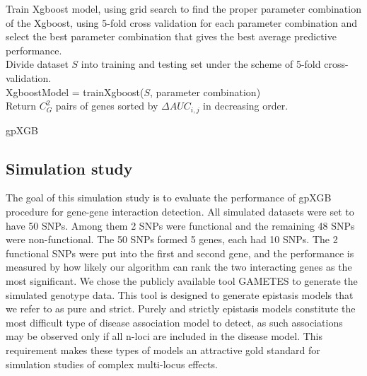 \documentclass[11pt]{article}
\theoremstyle{plain}
\theoremstyle{definition}
\theoremstyle{remark}
\begin{document}
\begin{algorithm}[H]
\SetAlgoLined
{}
Train Xgboost model, using grid search to find the proper parameter combination of the Xgboost, using 5-fold cross validation for each parameter combination and select the best parameter combination that gives the best average predictive performance.\\
Divide dataset $S$ into training and testing set under the scheme of 5-fold cross-validation.\\
XgboostModel = trainXgboost($S$, parameter combination)\\
Return $C^2_G$ pairs of genes sorted by $\Delta AUC_{i,j}$ in decreasing order.
 \caption{gpXGB}
\end{algorithm}

\subsection{Simulation study}

The goal of this simulation study is to evaluate the performance of gpXGB procedure for gene-gene interaction detection. All simulated datasets were set to have 50 SNPs. Among them 2 SNPs were functional and the remaining 48 SNPs were non-functional. The 50 SNPs formed 5 genes, each had 10 SNPs. The 2 functional SNPs were put into the first and second gene, and the performance is measured by how likely our algorithm can rank the two interacting genes as the most significant. We chose the publicly available tool GAMETES \cite{11} to generate the simulated genotype data. This tool is designed to generate epistasis models that we refer to as pure and strict. Purely and strictly epistasis models constitute the most difficult type of disease association model to detect, as such associations may be observed only if all n-loci are included in the disease model. This requirement makes these types of models an attractive gold standard for simulation studies of complex multi-locus effects. \\
\end{document}
